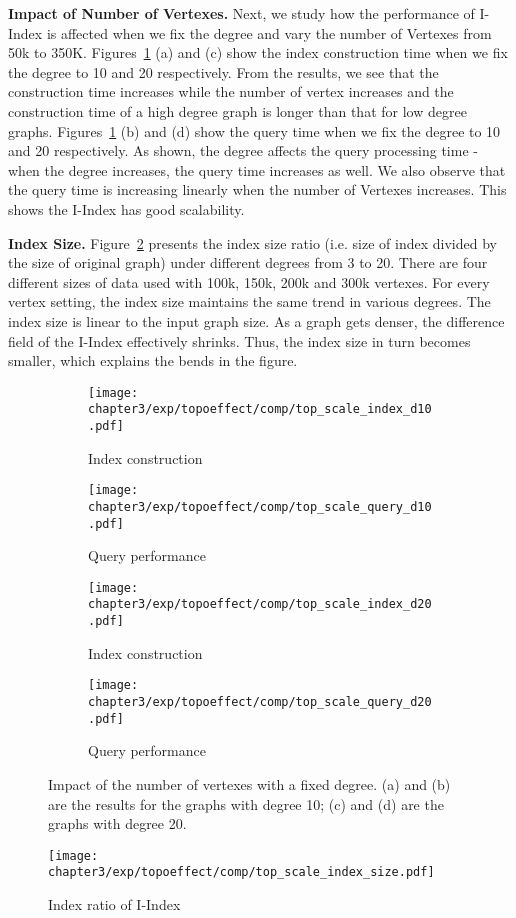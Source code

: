 \textbf{Impact of Number of Vertexes.} Next, we study how the performance of I-Index 
 is affected when we fix the degree and vary the number of Vertexes from 50k to 350K. 
Figures~\ref{fig:pi_effect2} (a) and (c) show the index construction time when we fix the degree to 
10 and 20 respectively. From the results, we see that the construction time increases while the number of vertex increases and the construction time of a high degree graph is longer than that for low degree graphs. Figures~\ref{fig:pi_effect2} (b) and (d) show the query time when we fix the degree to 10 and 20 respectively. 
As shown, the degree affects the query processing time - when the degree increases, the query time increases as well. We also observe that the query time is increasing linearly when the number of Vertexes increases. This shows the I-Index has good scalability.  

\textbf{Index Size.} Figure~\ref{fig:top-index-size} presents
the index size ratio (i.e. size of index divided by the size of original graph) under different degrees from 3 to 20. 
There are four different sizes of data used with 100k, 150k, 200k and 300k vertexes.  
For every vertex setting, the index size maintains the same trend in various degrees. The index size is linear to the input graph size. 
As a graph gets denser, the difference field of the I-Index
effectively shrinks. Thus, the index size in turn becomes smaller, which explains the bends in the figure.

\begin{figure}
\centering
\begin{subfigure}{0.48\linewidth}
  \centering
  \texttt{[image: chapter3/exp/topoeffect/comp/top\_scale\_index\_d10.pdf]}
  \caption{Index construction }
\end{subfigure}
\begin{subfigure}{0.48\linewidth}
  \centering
  \texttt{[image: chapter3/exp/topoeffect/comp/top\_scale\_query\_d10.pdf]}
  \caption{Query performance}
\end{subfigure}
\begin{subfigure}{0.48\linewidth}
  \centering
  \texttt{[image: chapter3/exp/topoeffect/comp/top\_scale\_index\_d20.pdf]}
  \caption{Index construction}
\end{subfigure}
\begin{subfigure}{0.48\linewidth}
  \centering
  \texttt{[image: chapter3/exp/topoeffect/comp/top\_scale\_query\_d20.pdf]}
  \caption{Query performance}
\end{subfigure}
\caption{Impact of the number of vertexes with a fixed degree. (a) and (b) 
are the results for the graphs with degree 10; (c) and (d) 
are the graphs with degree 20. }
\label{fig:pi_effect2}
\end{figure}

\begin{figure}[h]
\centering
\texttt{[image: chapter3/exp/topoeffect/comp/top\_scale\_index\_size.pdf]}
\caption{Index ratio of I-Index}
\label{fig:top-index-size}
\end{figure}


